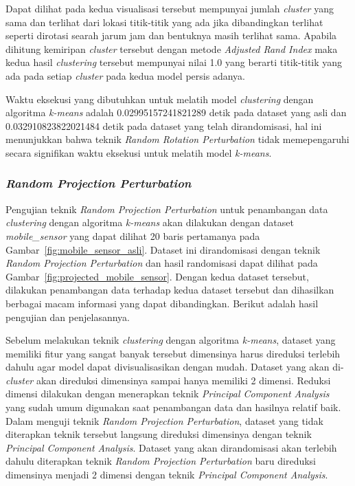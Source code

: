 Dapat dilihat pada kedua visualisasi tersebut mempunyai jumlah \textit{cluster} yang sama dan terlihat dari lokasi titik-titik yang ada jika dibandingkan terlihat seperti dirotasi searah jarum jam dan bentuknya masih terlihat sama. Apabila dihitung kemiripan \textit{cluster} tersebut dengan metode \textit{Adjusted Rand Index} maka kedua hasil \textit{clustering} tersebut mempunyai nilai 1.0 yang berarti titik-titik yang ada pada setiap \textit{cluster} pada kedua model persis adanya.
	
Waktu eksekusi yang dibutuhkan untuk melatih model \textit{clustering} dengan algoritma \textit{k-means} adalah 0.02995157241821289 detik pada dataset yang asli dan 0.032910823822021484 detik pada dataset yang telah dirandomisasi, hal ini menunjukkan bahwa teknik \textit{Random Rotation Perturbation} tidak memepengaruhi secara signifikan waktu eksekusi untuk melatih model \textit{k-means}.

\subsubsection{\textit{Random Projection Perturbation}}
\label{subsubsec:pengujian-clustering-rpp}

Pengujian teknik \textit{Random Projection Perturbation} untuk penambangan data \textit{clustering} dengan algoritma \textit{k-means} akan dilakukan dengan dataset \textit{mobile\_sensor} yang dapat dilihat 20 baris pertamanya pada Gambar~\ref{fig:mobile_sensor_asli}. Dataset ini dirandomisasi dengan teknik \textit{Random Projection Perturbation} dan hasil randomisasi dapat dilihat pada Gambar~\ref{fig:projected_mobile_sensor}. Dengan kedua dataset tersebut, dilakukan penambangan data terhadap kedua dataset tersebut dan dihasilkan berbagai macam informasi yang dapat dibandingkan. Berikut adalah hasil pengujian dan penjelasannya.

Sebelum melakukan teknik \textit{clustering} dengan algoritma \textit{k-means}, dataset yang memiliki fitur yang sangat banyak tersebut dimensinya harus direduksi terlebih dahulu agar model dapat divisualisasikan dengan mudah. Dataset yang akan di-\textit{cluster} akan direduksi dimensinya sampai hanya memiliki 2 dimensi. Reduksi dimensi dilakukan dengan menerapkan teknik \textit{Principal Component Analysis} yang sudah umum digunakan saat penambangan data dan hasilnya relatif baik. Dalam menguji teknik \textit{Random Projection Perturbation}, dataset yang tidak diterapkan teknik tersebut langsung direduksi dimensinya dengan teknik \textit{Principal Component Analysis}. Dataset yang akan dirandomisasi akan terlebih dahulu diterapkan teknik \textit{Random Projection Perturbation} baru direduksi dimensinya menjadi 2 dimensi dengan teknik \textit{Principal Component Analysis}.


